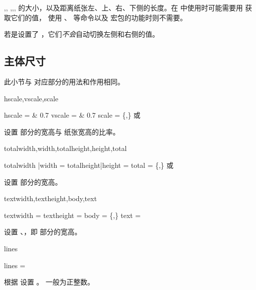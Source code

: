 \documentclass{cusdoc}
\begin{document}
\begin{function}{\layoutwidth,\layoutheight,
  \layoutloffset,\layouttoffset,\layoutroffset,\layoutboffset}
 的大小，以及距离纸张左、上、右、下侧的长度。在 \TikZ 中使用时可能需要用 
 获取它们的值，
使用 、 等命令以及  宏包的功能时则不需要。

若是设置了 ，它们\emph{不会}自动切换左侧和右侧的值。
\end{function}

\subsection{主体尺寸}

此小节与  对应部分的用法和作用相同。

\begin{keyval}[path=layout]{hscale,vscale,scale}
  \begin{syntax}
    hscale =  & 0.7
    vscale =  & 0.7
    scale  = \{,\} 或 
  \end{syntax}
设置  部分的宽高与 纸张宽高的比率。
\end{keyval}

\begin{keyval}[path=layout]{totalwidth,width,totalheight,height,total}
  \begin{syntax}
    totalwidth |width  = 
    totalheight|height = 
    total              = \{,\} 或 
  \end{syntax}
设置  部分的宽高。
\end{keyval}

\begin{keyval}[path=layout]{textwidth,textheight,body,text}
  \begin{syntax}
    textwidth  = 
    textheight = 
    body       = \{,\}
    text       = 
  \end{syntax}
设置 、，即  部分的宽高。
\end{keyval}

\begin{keyval}[path=layout]{lines}
  \begin{syntax}
    lines = 
  \end{syntax}
根据  设置 。 一般为正整数。
\end{keyval}
\end{document}
